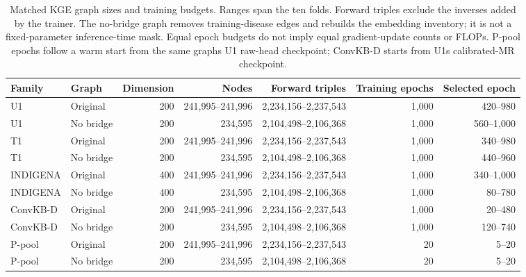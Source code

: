 \begin{table}[tb]
\centering\small
\caption{Matched KGE graph sizes and training budgets. Ranges span the ten folds. Forward triples exclude the inverses added by the trainer. The no-bridge graph removes training-disease edges and rebuilds the embedding inventory; it is not a fixed-parameter inference-time mask. Equal epoch budgets do not imply equal gradient-update counts or FLOPs. P-pool epochs follow a warm start from the same graph\textquotesingle s U1 raw-head checkpoint; ConvKB-D starts from U1\textquotesingle s calibrated-MR checkpoint.}
\label{tab:matched_kge_design}
\begin{adjustbox}{max width=\linewidth}
\begin{tabular}{llrrrrr}
\toprule
Family & Graph & Dimension & Nodes & Forward triples & Training epochs & Selected epoch \\
\midrule
U1 & Original & 200 & 241,995--241,996 & 2,234,156--2,237,543 & 1,000 & 420--980 \\
U1 & No bridge & 200 & 234,595 & 2,104,498--2,106,368 & 1,000 & 560--1,000 \\
T1 & Original & 200 & 241,995--241,996 & 2,234,156--2,237,543 & 1,000 & 340--980 \\
T1 & No bridge & 200 & 234,595 & 2,104,498--2,106,368 & 1,000 & 440--960 \\
INDIGENA & Original & 400 & 241,995--241,996 & 2,234,156--2,237,543 & 1,000 & 340--1,000 \\
INDIGENA & No bridge & 400 & 234,595 & 2,104,498--2,106,368 & 1,000 & 80--780 \\
ConvKB-D & Original & 200 & 241,995--241,996 & 2,234,156--2,237,543 & 1,000 & 20--480 \\
ConvKB-D & No bridge & 200 & 234,595 & 2,104,498--2,106,368 & 1,000 & 120--740 \\
P-pool & Original & 200 & 241,995--241,996 & 2,234,156--2,237,543 & 20 & 5--20 \\
P-pool & No bridge & 200 & 234,595 & 2,104,498--2,106,368 & 20 & 5--20 \\
\bottomrule
\end{tabular}
\end{adjustbox}
\end{table}
